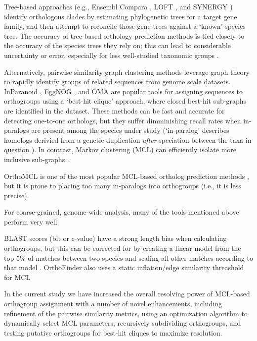 \documentclass[twocolumn]{bmcart}%
\begin{document}
Tree-based approaches (e.g., Ensembl Compara \cite{Vilella:2009ju}, LOFT \cite{vanderHeijden:2007bo}, and SYNERGY \cite{Wapinski:2007fa}) identify orthologous clades by estimating phylogenetic trees for a target gene family, and then attempt to reconcile those gene trees against a `known' species tree.
The accuracy of tree-based orthology prediction methods is tied closely to the accuracy of the species trees they rely on; this can lead to considerable uncertainty or error, especially for less well-studied taxonomic groups \cite{Xu:2016ek}.

Alternatively, pairwise similarity graph clustering methods leverage graph theory to rapidly identify groups of related sequences from genome scale datasets.
InParanoid \cite{OBrien:2005cy}, EggNOG \cite{Jensen:2007cc}, and OMA \cite{Roth:2009iu} are popular tools for assigning sequences to orthogroups using a `best-hit clique' approach, where closed best-hit sub-graphs are identified in the dataset.
These methods can be fast and accurate for detecting one-to-one orthologs, but they suffer dimminishing recall rates when in-paralogs are present among the species under study \cite{Dalquen:2013fz} (`in-paralog' describes homologs derivied from a genetic duplication \textit{after} speciation between the taxa in question \cite{Sonnhammer:2002vm,Tekaia:2016ga}).
In contrast, Markov clustering (MCL) can efficiently isolate more inclusive sub-graphs  \cite{VanDongen:kJZ890qx,Enright:2002uq}.

OrthoMCL is one of the most popular MCL-based ortholog prediction methods \cite{Li:2003en}, but it is prone to placing too many in-paralogs into orthogroups (i.e., it is less precise).

For coarse-grained, genome-wide analysis, many of the tools mentioned above perform very well.



BLAST scores (bit or e-value) have a strong length bias when calculating orthogroups, but this can be corrected for by creating a linear model from the top 5\% of matches between two species and scaling all other matches according to that model \cite{Emms:2015ig}. OrthoFinder also uses a static inflation/edge similarity threashold for MCL \cite{Emms:2015ig}

In the current study we have increased the overall resolving power of MCL-based orthogroup assignment with a number of novel enhancements, including refinement of the pairwise similarity metrics, using an optimization algorithm to dynamically select MCL parameters, recursively subdividing orthogroups, and testing putative orthogroups for best-hit cliques to maximize resolution.
\end{document}
